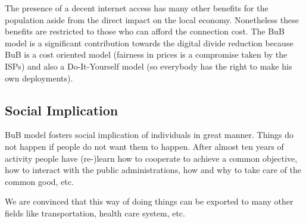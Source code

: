 The presence of a decent internet access has many other benefits for the population aside from the direct impact on the local economy. Nonetheless these benefits are restricted to those who can afford the connection cost. The BuB model is a significant contribution towards the digital divide reduction because BuB is a cost oriented model (fairness in prices is a compromise taken by the ISPs) and also a Do-It-Yourself model (so everybody has the right to make his own deployments).


\FloatBarrier
\subsection{Social Implication}
\label{res_social}

BuB model fosters social implication of individuals in great manner. Things do not happen if people do not want them to happen. After almost ten years of activity people have (re-)learn how to cooperate to achieve a common objective, how to interact with the public administrations, how and why to take care of the common good, etc.

We are convinced that this way of doing things can be exported to many other fields like transportation, health care system, etc.


